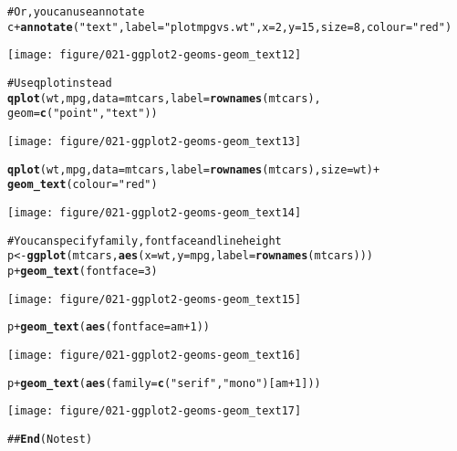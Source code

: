 \documentclass[a4paper,titlepage]{tufte-handout}\usepackage{graphicx, color}
\makeatletter
\def\maxwidth{ %
  \ifdim\Gin@nat@width>\linewidth
    \linewidth
  \else
    \Gin@nat@width
  \fi
}
\newcommand{\hlfunctioncall}[1]{\textcolor[rgb]{0.501960784313725,0,0.329411764705882}{\textbf{#1}}}%
\newcommand{\hlstring}[1]{\textcolor[rgb]{0.6,0.6,1}{#1}}%
\newcommand{\hlcomment}[1]{\textcolor[rgb]{0.180392156862745,0.6,0.341176470588235}{#1}}%
\newenvironment{kframe}{%
 \def\at@end@of@kframe{}%
 \ifinner\ifhmode%
  \def\at@end@of@kframe{\end{minipage}}%
  \begin{minipage}{\columnwidth}%
 \fi\fi%
 \def\FrameCommand##1{\hskip\@totalleftmargin \hskip-\fboxsep
 \colorbox{shadecolor}{##1}\hskip-\fboxsep
     \hskip-\linewidth \hskip-\@totalleftmargin \hskip\columnwidth}%
 \MakeFramed {\advance\hsize-\width
   \@totalleftmargin\z@ \linewidth\hsize
   \@setminipage}}%
 {\par\unskip\endMakeFramed%
 \at@end@of@kframe}
\newenvironment{knitrout}{}{} %
\makeatother
\begin{document}
\begin{knitrout}
\begin{kframe}
\begin{alltt}
\hlcomment{# Or, you can use annotate}
c + \hlfunctioncall{annotate}(\hlstring{"text"}, label = \hlstring{"plot mpg vs. wt"}, x = 2, y = 15, size = 8, colour = \hlstring{"red"})
\end{alltt}
\end{kframe}\texttt{[image: figure/021-ggplot2-geoms-geom\_text12]} \begin{kframe}\begin{alltt}
\hlcomment{# Use qplot instead}
\hlfunctioncall{qplot}(wt, mpg, data = mtcars, label = \hlfunctioncall{rownames}(mtcars),
   geom=\hlfunctioncall{c}(\hlstring{"point"}, \hlstring{"text"}))
\end{alltt}
\end{kframe}\texttt{[image: figure/021-ggplot2-geoms-geom\_text13]} \begin{kframe}\begin{alltt}
\hlfunctioncall{qplot}(wt, mpg, data = mtcars, label = \hlfunctioncall{rownames}(mtcars), size = wt) +
  \hlfunctioncall{geom_text}(colour = \hlstring{"red"})
\end{alltt}
\end{kframe}\texttt{[image: figure/021-ggplot2-geoms-geom\_text14]} \begin{kframe}\begin{alltt}
\hlcomment{# You can specify family, fontface and lineheight}
p <- \hlfunctioncall{ggplot}(mtcars, \hlfunctioncall{aes}(x=wt, y=mpg, label=\hlfunctioncall{rownames}(mtcars)))
p + \hlfunctioncall{geom_text}(fontface=3)
\end{alltt}
\end{kframe}\texttt{[image: figure/021-ggplot2-geoms-geom\_text15]} \begin{kframe}\begin{alltt}
p + \hlfunctioncall{geom_text}(\hlfunctioncall{aes}(fontface=am+1))
\end{alltt}
\end{kframe}\texttt{[image: figure/021-ggplot2-geoms-geom\_text16]} \begin{kframe}\begin{alltt}
p + \hlfunctioncall{geom_text}(\hlfunctioncall{aes}(family=\hlfunctioncall{c}(\hlstring{"serif"}, \hlstring{"mono"})[am+1]))
\end{alltt}
\end{kframe}\texttt{[image: figure/021-ggplot2-geoms-geom\_text17]} \begin{kframe}\begin{alltt}
\hlcomment{## \hlfunctioncall{End}(No test)}
\end{alltt}
\end{kframe}
\end{knitrout}
\end{document}
